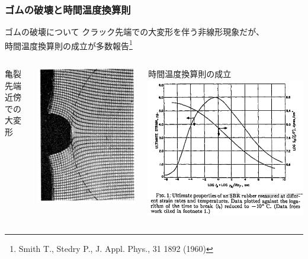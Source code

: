 \documentclass[12pt, dvipdfmx]{beamer}
\begin{document}
\begin{frame}
	\frametitle{ゴムの破壊と時間温度換算則}
		\begin{alertblock}{ゴムの破壊について}
			クラック先端での大変形を伴う非線形現象だが、\\時間温度換算則の成立が多数報告\footnote{
				Smith T., Stedry P., J. Appl. Phys., 31 1892 (1960)
			}
		\end{alertblock}
		\vspace{2mm}
		\begin{columns}[T, totalwidth=\textwidth]
				亀裂先端近傍での大変形
				\vspace{-3mm}
				\begin{center}
					\includegraphics[width=.55\textwidth]{rubber_crack.png}
				\end{center}
				時間温度換算則の成立
				\includegraphics[width=.8\textwidth]{Time_Temp_2.png}
		\end{columns}
\end{frame}
\end{document}
